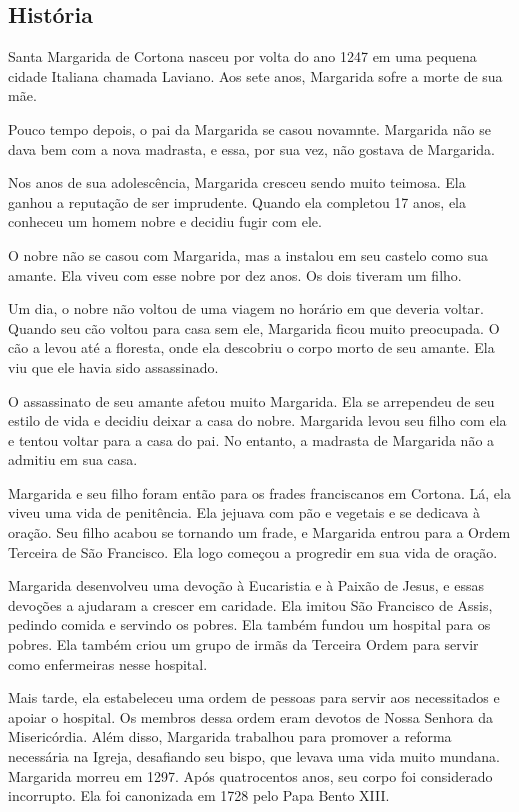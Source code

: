 \documentclass[18pt]{article}
\begin{document}
\begin{justify}

 \begin{center}
  \section{História}\label{sec:História} %
 \end{center}

Santa Margarida de Cortona nasceu por volta do ano 1247 em uma pequena cidade Italiana chamada Laviano. Aos sete anos, Margarida sofre a morte de sua mãe.

Pouco tempo depois, o pai da Margarida se casou novamnte. Margarida não se dava bem com a nova madrasta, e essa, por sua vez, não gostava de Margarida.

Nos anos de sua adolescência, Margarida cresceu sendo muito teimosa. Ela ganhou a reputação de ser imprudente. Quando ela completou 17 anos, ela conheceu um homem nobre e decidiu fugir com ele.

O nobre não se casou com Margarida, mas a instalou em seu castelo como sua amante. Ela viveu com esse nobre por dez anos. Os dois tiveram um filho.

Um dia, o nobre não voltou de uma viagem no horário em que deveria voltar. Quando seu cão voltou para casa sem ele, Margarida ficou muito preocupada. O cão a levou até a floresta, onde ela descobriu o corpo morto de seu amante. Ela viu que ele havia sido assassinado.

O assassinato de seu amante afetou muito Margarida. Ela se arrependeu de seu estilo de vida e decidiu deixar a casa do nobre. Margarida levou seu filho com ela e tentou voltar para a casa do pai. No entanto, a madrasta de Margarida não a admitiu em sua casa.

Margarida e seu filho foram então para os frades franciscanos em Cortona. Lá, ela viveu uma vida de penitência. Ela jejuava com pão e vegetais e se dedicava à oração. Seu filho acabou se tornando um frade, e Margarida entrou para a Ordem Terceira de São Francisco. Ela logo começou a progredir em sua vida de oração.

Margarida desenvolveu uma devoção à Eucaristia e à Paixão de Jesus, e essas devoções a ajudaram a crescer em caridade. Ela imitou São Francisco de Assis, pedindo comida e servindo os pobres. Ela também fundou um hospital para os pobres. Ela também criou um grupo de irmãs da Terceira Ordem para servir como enfermeiras nesse hospital. 

Mais tarde, ela estabeleceu uma ordem de pessoas para servir aos necessitados e apoiar o hospital. Os membros dessa ordem eram devotos de Nossa Senhora da Misericórdia. Além disso, Margarida trabalhou para promover a reforma necessária na Igreja, desafiando seu bispo, que levava uma vida muito mundana. Margarida morreu em 1297. Após quatrocentos anos, seu corpo foi considerado incorrupto. Ela foi canonizada em 1728 pelo Papa Bento XIII.

\end{justify}
\end{document}
